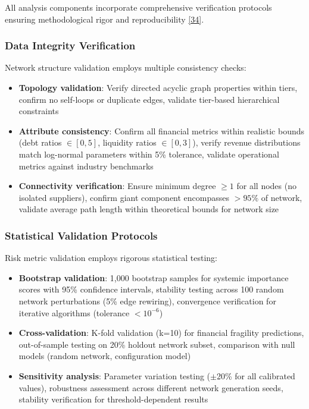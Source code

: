 \documentclass[a4 paper, 11pt,twoside]{article}
\newcommand{\0}{\Bf{0}}
\theoremstyle{definition}
\begin{document}
All analysis components incorporate comprehensive verification protocols ensuring methodological rigor and reproducibility \hyperref[ref34]{[34]}. 

\subsubsection{Data Integrity Verification}

Network structure validation employs multiple consistency checks:
\begin{itemize}
\item \textbf{Topology validation}: Verify directed acyclic graph properties within tiers, confirm no self-loops or duplicate edges, validate tier-based hierarchical constraints
\item \textbf{Attribute consistency}: Confirm all financial metrics within realistic bounds (debt ratios $\in [0,5]$, liquidity ratios $\in [0,3]$), verify revenue distributions match log-normal parameters within 5\% tolerance, validate operational metrics against industry benchmarks
\item \textbf{Connectivity verification}: Ensure minimum degree $\geq 1$ for all nodes (no isolated suppliers), confirm giant component encompasses $>95\%$ of network, validate average path length within theoretical bounds for network size
\end{itemize}

\subsubsection{Statistical Validation Protocols}

Risk metric validation employs rigorous statistical testing:
\begin{itemize}
\item \textbf{Bootstrap validation}: 1,000 bootstrap samples for systemic importance scores with 95\% confidence intervals, stability testing across 100 random network perturbations (5\% edge rewiring), convergence verification for iterative algorithms (tolerance $< 10^{-6}$)
\item \textbf{Cross-validation}: K-fold validation (k=10) for financial fragility predictions, out-of-sample testing on 20\% holdout network subset, comparison with null models (random network, configuration model)
\item \textbf{Sensitivity analysis}: Parameter variation testing ($\pm$20\% for all calibrated values), robustness assessment across different network generation seeds, stability verification for threshold-dependent results
\end{itemize}
\end{document}
